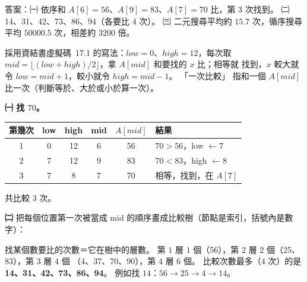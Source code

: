 \begin{pastsoln}
答案：㈠ 依序和 $A[6] = 56$、$A[9] = 83$、$A[7] = 70$ 比，第 $3$ 次找到。 ㈡ 14、31、42、73、86、94（各要比
$4$ 次）。 ㈢ 二元搜尋平均約 $15.7$ 次，循序搜尋平均 $50000.5$ 次，相差約 $3200$ 倍。

採用資結書虛擬碼~17.1 的寫法：$\mathit{low} = 0$、$\mathit{high} = 12$，每次取
$\mathit{mid} = \lfloor (\mathit{low} + \mathit{high})/2 \rfloor$，拿 $A[\mathit{mid}]$ 和要找的 $x$ 比；相等就
找到，$x$ 較大就令 $\mathit{low} = \mathit{mid} + 1$，較小就令 $\mathit{high} = \mathit{mid} - 1$。 「一次比較」
指和一個 $A[\mathit{mid}]$ 比一次（判斷等於、大於或小於算一次）。

\textbf{㈠ 找 $70$。}
\begin{center}
\small
\begin{tabular}{cccccl}
\toprule
第幾次 & low & high & mid & $A[\mathit{mid}]$ & 結果 \\
\midrule
1 & 0 & 12 & 6 & 56 & $70 > 56$，low $\gets 7$ \\
2 & 7 & 12 & 9 & 83 & $70 < 83$，high $\gets 8$ \\
3 & 7 & 8 & 7 & 70 & 相等，找到，在 $A[7]$ \\
\bottomrule
\end{tabular}
\end{center}
共比較 $3$ 次。

\textbf{㈡} 把每個位置第一次被當成 mid 的順序畫成比較樹（節點是索引，括號內是數字）：
\begin{center}
\end{center}
找某個數要比的次數＝它在樹中的層數。 第 $1$ 層 $1$ 個（56），第 $2$ 層 $2$ 個（25、83），第 $3$ 層 $4$ 個
（4、37、70、90），第 $4$ 層 $6$ 個。 比較次數最多（$4$ 次）的是 \textbf{14、31、42、73、86、94}。
例如找 $14$：$56 \to 25 \to 4 \to 14$。


\end{pastsoln}
